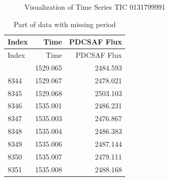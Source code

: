 \documentclass[
]{article}
\begin{document}
\begin{figure}[H]

{\centering {}

}

\caption{Visualization of Time Series TIC 0131799991}\label{fig:ts}
\end{figure}

\begin{longtable}[]{@{}lrr@{}}
\caption{\label{tab:summary} Part of data with missing period}\tabularnewline
\toprule\noalign{}
Index & Time & PDCSAF Flux \\
\midrule\noalign{}
\endfirsthead
\toprule\noalign{}
Index & Time & PDCSAF Flux \\
\midrule\noalign{}
\endhead
\bottomrule\noalign{}
\endlastfoot
8343 & 1529.065 & 2484.593 \\
8344 & 1529.067 & 2478.021 \\
8345 & 1529.068 & 2503.103 \\
8346 & 1535.001 & 2486.231 \\
8347 & 1535.003 & 2476.867 \\
8348 & 1535.004 & 2486.383 \\
8349 & 1535.006 & 2487.144 \\
8350 & 1535.007 & 2479.111 \\
8351 & 1535.008 & 2488.168 \\
\end{longtable}
\end{document}
